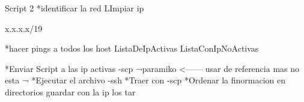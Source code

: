 Script 2
*identificar la red
    LImpiar ip



    x.x.x.x/19



*hacer pings a todos los host
    ListaDeIpActivas
    ListaConIpNoActivas

*Enviar Script a las ip activas
    -scp
        ¬paramiko <------ usar de referencia mas no esta
        ¬
*Ejecutar el archivo
    -ssh
*Traer con 
    -scp
*Ordenar la finormacion en directorios
    guardar con la ip los tar